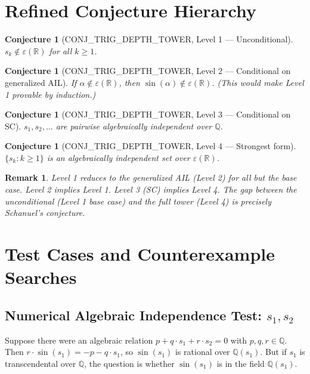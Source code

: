 \documentclass[11pt]{article}
\newtheorem{remark}[theorem]{Remark}
\newtheorem{conjecture}[theorem]{Conjecture}
\begin{document}
\section{Refined Conjecture Hierarchy}

\begin{conjecture}[CONJ\_TRIG\_DEPTH\_TOWER, Level 1 --- Unconditional]
$s_k\notin\varepsilon(\mathbb{R})$ for all $k\geq1$.
\end{conjecture}

\begin{conjecture}[CONJ\_TRIG\_DEPTH\_TOWER, Level 2 --- Conditional on generalized AIL]
If $\alpha\notin\varepsilon(\mathbb{R})$, then $\sin(\alpha)\notin\varepsilon(\mathbb{R})$.
(This would make Level 1 provable by induction.)
\end{conjecture}

\begin{conjecture}[CONJ\_TRIG\_DEPTH\_TOWER, Level 3 --- Conditional on SC]
$s_1,s_2,\ldots$ are pairwise algebraically independent over $\mathbb{Q}$.
\end{conjecture}

\begin{conjecture}[CONJ\_TRIG\_DEPTH\_TOWER, Level 4 --- Strongest form]
$\{s_k:k\geq1\}$ is an algebraically independent set over $\varepsilon(\mathbb{R})$.
\end{conjecture}

\begin{remark}
Level 1 reduces to the generalized AIL (Level 2) for all but the base case.
Level 2 implies Level 1. Level 3 (SC) implies Level 4.
The gap between the unconditional (Level 1 base case) and the full tower (Level 4)
is precisely Schanuel's conjecture.
\end{remark}

\section{Test Cases and Counterexample Searches}

\subsection{Numerical Algebraic Independence Test: $s_1, s_2$}

Suppose there were an algebraic relation $p + q\cdot s_1 + r\cdot s_2 = 0$ with $p,q,r\in\mathbb{Q}$.
Then $r\cdot\sin(s_1) = -p - q\cdot s_1$, so $\sin(s_1)$ is rational over $\mathbb{Q}(s_1)$.
But if $s_1$ is transcendental over $\mathbb{Q}$, the question is whether $\sin(s_1)$
is in the field $\mathbb{Q}(s_1)$.
\end{document}
